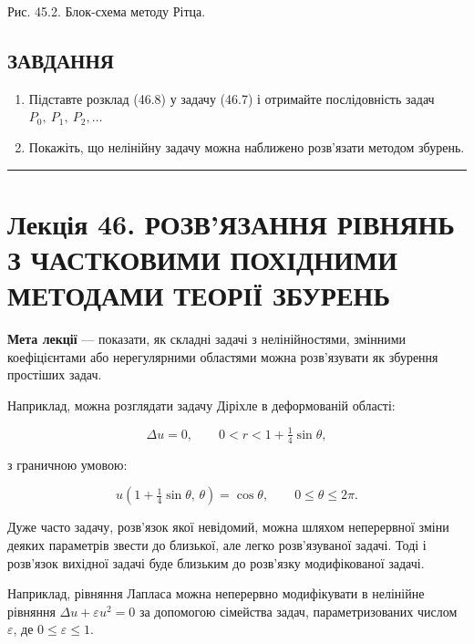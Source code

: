 \documentclass[
  ukrainian,
]{article}
\begin{document}
Рис. 45.2. Блок-схема методу Рітца.

\subsection{ЗАВДАННЯ}\label{ux437ux430ux432ux434ux430ux43dux43dux44f-26}

\begin{enumerate}
\def\labelenumi{\arabic{enumi}.}
\item
  Підставте розклад (46.8) у задачу (46.7) і отримайте послідовність
  задач \(P_0,\ P_1,\ P_2,\ldots\)
\item
  Покажіть, що нелінійну задачу можна наближено розв'язати методом
  збурень.
\end{enumerate}

\begin{center}\rule{0.5\linewidth}{0.5pt}\end{center}

\section{Лекція 46. РОЗВ'ЯЗАННЯ РІВНЯНЬ З ЧАСТКОВИМИ ПОХІДНИМИ МЕТОДАМИ
ТЕОРІЇ
ЗБУРЕНЬ}\label{ux43bux435ux43aux446ux456ux44f-46.-ux440ux43eux437ux432ux44fux437ux430ux43dux43dux44f-ux440ux456ux432ux43dux44fux43dux44c-ux437-ux447ux430ux441ux442ux43aux43eux432ux438ux43cux438-ux43fux43eux445ux456ux434ux43dux438ux43cux438-ux43cux435ux442ux43eux434ux430ux43cux438-ux442ux435ux43eux440ux456ux457-ux437ux431ux443ux440ux435ux43dux44c}

\textbf{Мета лекції} --- показати, як складні задачі з нелінійностями,
змінними коефіцієнтами або нерегулярними областями можна розв'язувати як
збурення простіших задач.

Наприклад, можна розглядати задачу Діріхле в деформованій області:

\[\Delta u = 0, \qquad 0 < r < 1 + \tfrac{1}{4}\sin\theta,\]

з граничною умовою:

\[u\!\left(1+\tfrac{1}{4}\sin\theta,\,\theta\right) = \cos\theta, \qquad 0 \le \theta \le 2\pi.\]

Дуже часто задачу, розв'язок якої невідомий, можна шляхом неперервної
зміни деяких параметрів звести до близької, але легко розв'язуваної
задачі. Тоді і розв'язок вихідної задачі буде близьким до розв'язку
модифікованої задачі.

Наприклад, рівняння Лапласа можна неперервно модифікувати в нелінійне
рівняння \(\Delta u + \varepsilon u^2 = 0\) за допомогою сімейства
задач, параметризованих числом \(\varepsilon\), де
\(0 \le \varepsilon \le 1\).
\end{document}
